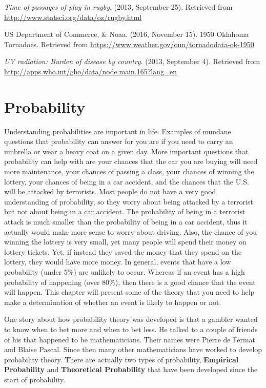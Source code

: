 \documentclass[
]{book}
\begin{document}
\emph{Time of passages of play in rugby}. (2013, September 25). Retrieved
from \url{http://www.statsci.org/data/oz/rugby.html}

US Department of Commerce, \& Noaa. (2016, November 15). 1950 Oklahoma Tornadoes. Retrieved from \url{https://www.weather.gov/oun/tornadodata-ok-1950}

\emph{UV radiation: Burden of disease by country}. (2013, September 4).
Retrieved from \url{http://apps.who.int/gho/data/node.main.165?lang=en}

\hypertarget{probability}{%
\chapter{Probability}\label{probability}}

Understanding probabilities are important in life. Examples of mundane questions that probability can answer for you are if you need to carry an umbrella or wear a heavy coat on a given day. More important questions that probability can help with are your chances that the car you are buying will need more maintenance, your chances of passing a class, your chances of winning the lottery, your chances of being in a car accident, and the chances that the U.S. will be attacked by terrorists. Most people do not have a very good understanding of probability, so they worry about being attacked by a terrorist but not about being in a car accident. The probability of being in a terrorist attack is much smaller than the probability of being in a car accident, thus it actually would make more sense to worry about driving. Also, the chance of you winning the lottery is very small, yet many people will spend their money on lottery tickets. Yet, if instead they saved the money that they spend on the lottery, they would have more money. In general, events that have a low probability (under 5\%) are unlikely to occur. Whereas if an event has a high probability of happening (over 80\%), then there is a good chance that the event will happen. This chapter will present some of the theory that you need to help make a determination of whether an event is likely to happen or not.

One story about how probability theory was developed is that a gambler wanted to know when to bet more and when to bet less. He talked to a couple of friends of his that happened to be mathematicians. Their names were Pierre de Fermat and Blaise Pascal. Since then many other mathematicians have worked to develop probability theory. There are actually two types of probability, \textbf{Empirical Probability} and \textbf{Theoretical Probability} that have been developed since the start of probability.
\end{document}
